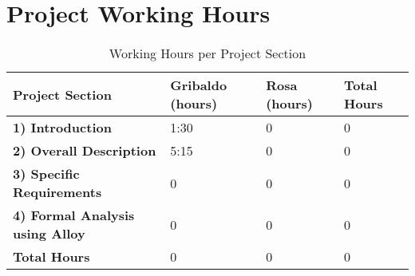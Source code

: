 \section*{Project Working Hours}

\begin{table}[ht!]
\centering
\begin{tabular}{|p{6cm}|p{2.5cm}|p{2.5cm}|p{2.5cm}|}
\hline
\textbf{Project Section} & \textbf{Gribaldo (hours)} & \textbf{Rosa (hours)} & \textbf{Total Hours} \\
\hline
\textbf{ 1) Introduction}                   & 1:30   & 0   & 0   \\
\textbf{ 2) Overall Description}            & 5:15    & 0  & 0   \\
\textbf{ 3) Specific Requirements}          & 0     & 0   & 0   \\
\textbf{ 4) Formal Analysis using Alloy}    & 0     & 0      & 0   \\
\hline
\textbf{Total Hours}                        & 0     & 0     & 0   \\
\hline
\end{tabular}
\caption{Working Hours per Project Section}
\label{tab:working_hours}
\end{table}

\vspace*{\fill}
